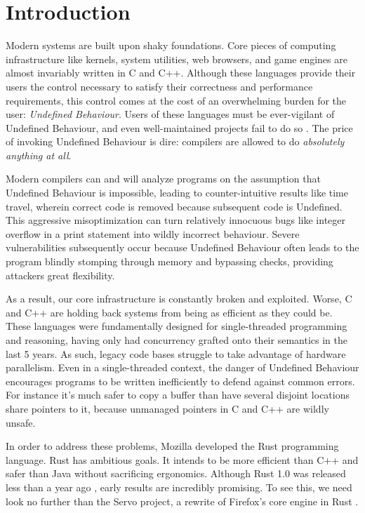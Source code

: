 \chapter{Introduction}
\label{ch:intro}

Modern systems are built upon shaky foundations. Core pieces of computing
infrastructure like kernels, system utilities, web browsers, and game engines
are almost invariably written in C and C++. Although these languages provide
their users the control necessary to satisfy their correctness and performance
requirements, this control comes at the cost of an overwhelming burden for the
user: \emph{Undefined Behaviour}. Users of these languages must be ever-vigilant
of Undefined Behaviour, and even well-maintained projects fail to do so
\cite{wang2012undefined}. The price of invoking Undefined Behaviour is dire:
compilers are allowed to do \emph{absolutely anything at all}.

Modern compilers can and will analyze programs on the assumption that Undefined
Behaviour is impossible, leading to counter-intuitive results like time travel,
wherein correct code is removed because subsequent code is Undefined. This
aggressive misoptimization can turn relatively innocuous bugs like integer
overflow in a print statement into wildly incorrect behaviour. Severe
vulnerabilities subsequently occur because Undefined Behaviour often leads to
the program blindly stomping through memory and bypassing checks, providing attackers
great flexibility.

As a result, our core infrastructure is constantly broken and exploited. Worse,
C and C++ are holding back systems from being as efficient as they could be.
These languages were fundamentally designed for single-threaded programming and
reasoning, having only had concurrency grafted onto their semantics in the last
5 years. As such, legacy code bases struggle to take advantage of hardware
parallelism. Even in a single-threaded context,
the danger of Undefined Behaviour encourages programs to be written
inefficiently to defend against common errors. For instance it's much safer
to copy a buffer than have several disjoint locations share pointers to it,
because unmanaged pointers in C and C++ are wildly unsafe.

In order to address these problems, Mozilla developed the Rust programming language.
Rust has ambitious goals. It intends to be more efficient than C++ and safer
than Java without sacrificing ergonomics. Although Rust 1.0 was released less
than a year ago \cite{rust1}, early results are incredibly promising. To see this, we need
look no further than the Servo project, a rewrite of Firefox's core engine in Rust
\cite{servo}.

